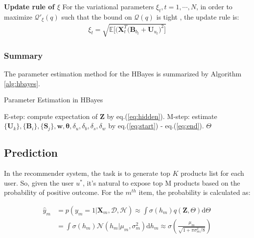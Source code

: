 \noindent \textbf{Update rule of $\xi$}
For the variational parameters $\xi_{t}, t=1,\cdots,N$, in order to maximize $\mathcal{Q}'_{\xi}(q)$ such that the bound on $\mathcal{Q}(q)$ is tight \cite{bishop2006pattern}, the update rule is: 
\begin{align}
\xi_{t}=\sqrt{\mathbb{E}\Big[\big(\bm{X}_t^T(\mathbf{B}_{b_t}+\mathbf{U}_{u_t}\big)^2\Big]}
\label{eq:end}
\end{align}


\subsubsection{Summary}
The parameter estimation method for the HBayes is summarized by Algorithm \ref{alg:hbayes}.

\begin{algorithm}
\caption{Parameter Estimation in HBayes}
\label{alg:hbayes}
\begin{algorithmic}[1]

\Repeat
\State E-step: compute expectation of $\mathbf{Z}$ by eq.(\ref{eq:hidden}).
\State M-step: estimate $\{\bm{U}_k\}, \{\bm{B}_i\}, \{\bm{S}_j\}, \bm{w}, \boldsymbol{\theta}, \delta_u,\delta_b,\delta_s,\delta_w$ by eq.(\ref{eq:start}) - eq.(\ref{eq:end}).
\State
\Return $\Theta$
\EndProcedure
\end{algorithmic}
\end{algorithm}

\subsection{Prediction}

In the recommender system, the task is to generate top $K$ products list for each user. So, given the user $u^*$,  it's natural to expose top M products based on the probability of positive outcome. For the $m^{th}$ item, the probability is calculated as:

\begin{equation}
\label{prediction}
\begin{split}
\hat{y}_m & = p(y_m=1|\bm{X}_m,\mathcal{D},\mathcal{H}) \approx \int \sigma(h_{m})q(\bm{Z},\Theta)\mathrm{d}\Theta \nonumber \\
& = \int \sigma(h_{m})\mathcal{N}(h_{m}|\mu_{m},\sigma^2_{m})\mathrm{d}h_{m} \approx \sigma(\frac{\mu_{m}}{\sqrt{1+\pi\sigma^2_{m}/8}})
\end{split}
\end{equation}

